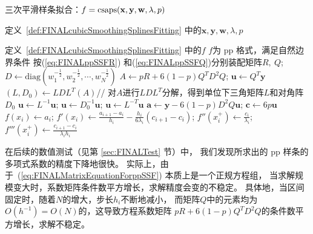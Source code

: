 \begin{algorithm}[htb]
\caption{三次平滑样条拟合：$f=\textnormal{csaps}(\mathbf{x}, \mathbf{y}, \mathbf{w}, \lambda, p)$}
\label{alg:FINALppSSF}
\begin{algorithmic}[1] 
  \renewcommand{\algorithmicrequire}{ \textbf{Input:}} %
  \REQUIRE  %
  定义~\ref{def:FINALcubicSmoothingSplinesFitting} 中的$\mathbf{x}, \mathbf{y}, \mathbf{w}, \lambda, p$
    
      \renewcommand{\algorithmicrequire}{ \textbf{Preconditions:}} %
      
    \renewcommand{\algorithmicensure}{ \textbf{Output:}} %
  \ENSURE  %
  定义~\ref{def:FINALcubicSmoothingSplinesFitting} 中的$f$
\renewcommand{\algorithmicensure}{ \textbf{Postconditions:}} %
\ENSURE  %
    $f$为 pp 格式，满足自然边界条件
    \STATE 按(\ref{eq:FINALppSSFR}) 和(\ref{eq:FINALppSSFQ})分别装配矩阵$R,\ Q$;
    $D\leftarrow \text{diag}(w_{1}^{-\frac{1}{2}},w_{2}^{-\frac{1}{2}},\cdots, w_{N}^{-\frac{1}{2}})$
    \STATE $A\leftarrow pR+6(1-p)Q^{T}D^{2}Q$; $\mathbf{u}\leftarrow Q^{T}\mathbf{y}$
    \STATE $(L,D_{0})\leftarrow LDL^{T}(A)$\hfill // 对$A$进行$LDL^{T}$分解，得到单位下三角矩阵$L$和对角阵$D_{0}$
    \STATE $\mathbf{u}\leftarrow L^{-1}\mathbf{u}$; $\mathbf{u}\leftarrow D_{0}^{-1}\mathbf{u}$; $\mathbf{u}\leftarrow L^{-T}\mathbf{u}$
    \STATE $\mathbf{a}\leftarrow \mathbf{y}-6(1-p)D^{2}Q\mathbf{u}$; $\mathbf{c}\leftarrow 6p\mathbf{u}$
    \STATE $f(x_{i})\leftarrow a_{i}$; $f'(x_{i})\leftarrow \frac{a_{i+1}-a_{i}}{h_{i}}-\frac{h_{i}}{6\lambda_{i}}(c_{i+1}-c_{i})$;
    $f''(x_{i}^{+})\leftarrow \frac{c_{i}}{\lambda_{i}}$;
    $f'''(x_{i}^{+})\leftarrow \frac{c_{i+1}-c_{i}}{\lambda_{i}h_{i}}$
    \ENDFOR
\end{algorithmic}
\end{algorithm}

在后续的数值测试（见第 \ref{sec:FINALTest} 节）中，
我们发现所求出的 pp 样条的多项式系数的精度下降地很快。
实际上，由于~(\ref{eq:FINALMatrixEquationForppSSF}) 本质上是一个正规方程组，
当求解规模变大时，系数矩阵条件数平方增长，求解精度会变的不稳定。
具体地，当区间固定时，随着$N$的增大，步长$h_{i}$不断地减小，
而矩阵$Q$中的元素均为$O(h^{-1})=O(N)$的，这导致方程系数矩阵
$pR+6(1-p)Q^{T}D^{2}Q$的条件数平方增长，求解不稳定。
